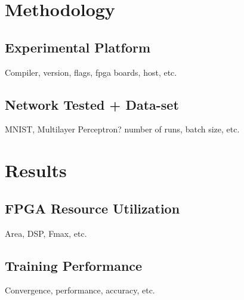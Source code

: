 \documentclass[techrep,english]{ipsj}
\begin{document}
\section{Methodology}
\subsection{Experimental Platform}
Compiler, version, flags, fpga boards, host, etc.
\subsection{Network Tested + Data-set}
MNIST, Multilayer Perceptron?
number of runs, batch size, etc.

\section{Results}

\subsection{FPGA Resource Utilization}
Area, DSP, Fmax, etc.

\subsection{Training Performance}
Convergence, performance, accuracy, etc.
\end{document}
